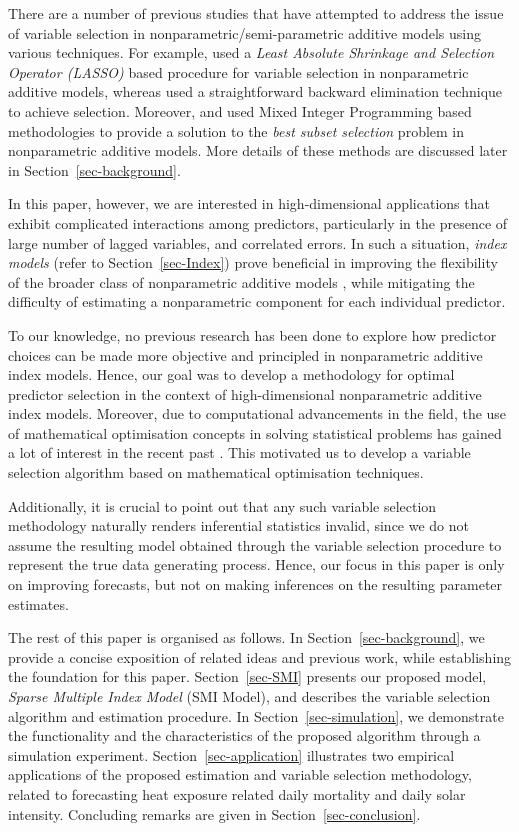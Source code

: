 \documentclass[11pt,a4paper,]{article}
\begin{document}
There are a number of previous studies that have attempted to address
the issue of variable selection in nonparametric/semi-parametric
additive models using various techniques. For example,
\textcite{Huang2010} used a \emph{Least Absolute Shrinkage and Selection
Operator (LASSO)} \autocite{Tibshirani1996} based procedure for variable
selection in nonparametric additive models, whereas \textcite{FH2012}
used a straightforward backward elimination technique to achieve
selection. Moreover, \textcite{Ibrahim2021} and \textcite{Hazimeh2023}
used Mixed Integer Programming based methodologies to provide a solution
to the \emph{best subset selection} problem in nonparametric additive
models. More details of these methods are discussed later in
Section~\ref{sec-background}.

In this paper, however, we are interested in high-dimensional
applications that exhibit complicated interactions among predictors,
particularly in the presence of large number of lagged variables, and
correlated errors. In such a situation, \emph{index models} (refer to
Section~\ref{sec-Index}) prove beneficial in improving the flexibility
of the broader class of nonparametric additive models
\autocite{Radchenko2015}, while mitigating the difficulty of estimating
a nonparametric component for each individual predictor.

To our knowledge, no previous research has been done to explore how
predictor choices can be made more objective and principled in
nonparametric additive index models. Hence, our goal was to develop a
methodology for optimal predictor selection in the context of
high-dimensional nonparametric additive index models. Moreover, due to
computational advancements in the field, the use of mathematical
optimisation concepts in solving statistical problems has gained a lot
of interest in the recent past \autocite{Theusl2020}. This motivated us
to develop a variable selection algorithm based on mathematical
optimisation techniques.

Additionally, it is crucial to point out that any such variable
selection methodology naturally renders inferential statistics invalid,
since we do not assume the resulting model obtained through the variable
selection procedure to represent the true data generating process.
Hence, our focus in this paper is only on improving forecasts, but not
on making inferences on the resulting parameter estimates.

The rest of this paper is organised as follows. In
Section~\ref{sec-background}, we provide a concise exposition of related
ideas and previous work, while establishing the foundation for this
paper. Section~\ref{sec-SMI} presents our proposed model, \emph{Sparse
Multiple Index Model} (SMI Model), and describes the variable selection
algorithm and estimation procedure. In Section~\ref{sec-simulation}, we
demonstrate the functionality and the characteristics of the proposed
algorithm through a simulation experiment. Section~\ref{sec-application}
illustrates two empirical applications of the proposed estimation and
variable selection methodology, related to forecasting heat exposure
related daily mortality and daily solar intensity. Concluding remarks
are given in Section~\ref{sec-conclusion}.
\end{document}
